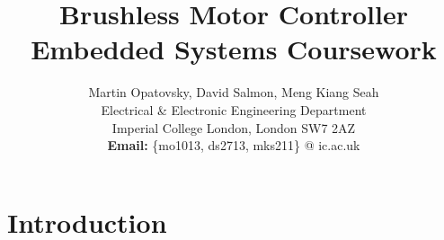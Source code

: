 \documentclass[a4paper, 10pt, conference]{ieeeconf}
\title{Brushless Motor Controller \\ Embedded Systems Coursework}
\author{Martin Opatovsky, David Salmon, Meng Kiang Seah\\
Electrical \& Electronic Engineering Department\\
Imperial College London, London SW7 2AZ\\
\textbf{Email:} \{mo1013, ds2713, mks211\} @ ic.ac.uk\\
}
\begin{document}
\maketitle

\begin{abstract}

\end{abstract}

\section{Introduction}




\end{document}
